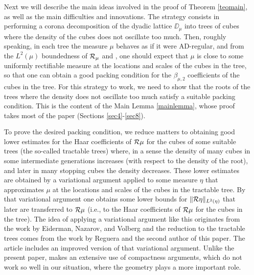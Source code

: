 Next we will describe the main ideas involved in the proof of Theorem \ref{teomain}, as well as the 
main difficulties and innovations.
The strategy consists in performing a corona decomposition of the dyadic lattice $\DD_\mu$ into trees of cubes where the density of the cubes does not oscillate too much. Then, roughly speaking,  in each tree the measure
$\mu$ behaves as if it were AD-regular, and from the $L^2(\mu)$ boundedness of ${\mathcal R}_\mu$ and
\cite{NToV1}, one should expect that $\mu$ is close to some uniformly rectifiable measure at the locations and scales of the cubes in the tree, so that one can obtain a good packing condition
for the $\beta_{\mu,2}$ coefficients of the cubes in the tree.
For this strategy to work, we need to show that the roots of the trees where the density does
not oscillate too much satisfy a suitable packing condition. This is the content of the Main Lemma
\ref{mainlemma}, whose proof takes most of the paper (Sections \ref{sec4}-\ref{sec8}).

To prove the desired packing condition, we reduce matters to obtaining good lower estimates for 
the Haar coefficients of ${\mathcal R}\mu$ for the cubes of some suitable trees
(the so-called tractable trees) where, in a sense the density of many cubes in some intermediate generations increases (with respect to the density of the root), and later in many stopping cubes the density decreases. These lower estimates are obtained by a variational argument applied to some measure $\eta$ that approximates $\mu$ at the locations and scales of the cubes in the tractable tree.
By that variational argument one obtains some lower bounds for $\|{\mathcal R}\eta\|_{L^2(\eta)}$
that later are transferred to ${\mathcal R}\mu$ (i.e., to the Haar coefficients of ${\mathcal R}\mu$ 
for the cubes in the tree). The idea of applying a variational argument like this
originates from the work \cite{ENVo} by Eiderman, Nazarov, and Volberg and the reduction
to the tractable trees comes from the work \cite{Reguera-Tolsa} by Reguera and the second author of 
this paper. The article \cite{JNRT} includes an improved version of that variational argument.
Unlike the present paper, \cite{JNRT} makes an extensive use of compactness arguments, which
do not work so well in our situation, where the geometry plays a more important role.

